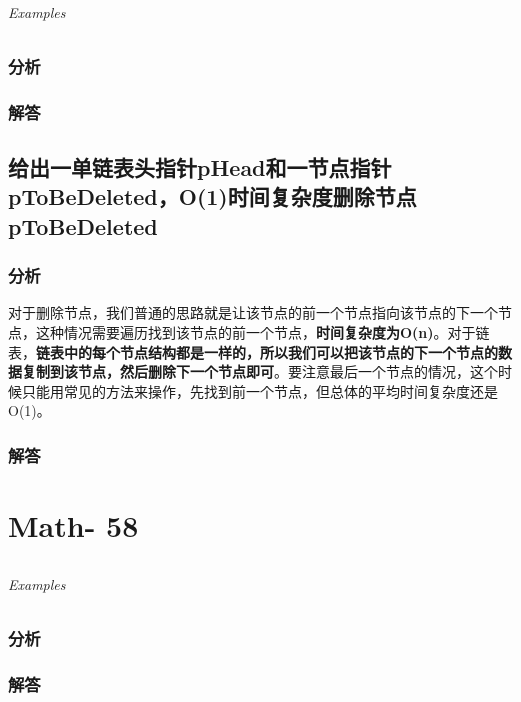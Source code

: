 \documentclass[UTF8,a4paper,12pt]{ctexbook}
\begin{document}
	\subparagraph{Examples}
	
	\subsection{分析}
	
	\subsection{解答}
	

\section{给出一单链表头指针pHead和一节点指针pToBeDeleted，O(1)时间复杂度删除节点pToBeDeleted}
	\subsection{分析}
		对于删除节点，我们普通的思路就是让该节点的前一个节点指向该节点的下一个节点，这种情况需要遍历找到该节点的前一个节点，\textbf{时间复杂度为O(n)}。对于链表，\textbf{链表中的每个节点结构都是一样的，所以我们可以把该节点的下一个节点的数据复制到该节点，然后删除下一个节点即可}。要注意最后一个节点的情况，这个时候只能用常见的方法来操作，先找到前一个节点，但总体的平均时间复杂度还是O(1)。
	\subsection{解答}

\chapter{Math- 58}
\section{}
	
	\subparagraph{Examples}
	
	\subsection{分析}
	
	\subsection{解答}
	
\section{}
	
\end{document}
